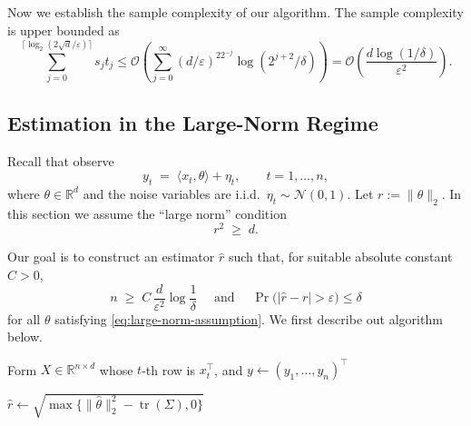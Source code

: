 Now we establish the sample complexity of our algorithm. The sample complexity is upper bounded as
\[
\sum_{j=0}^{\lceil\log_2(2\sqrt{d}/\varepsilon)\rceil}s_jt_j\leq\mathcal{O}\left(\sum_{j=0}^\infty(d/\varepsilon)^22^{-j}\log(2^{j+2}/\delta)\right)=\mathcal{O}\left(\frac{d\log(1/\delta)}{\varepsilon^2}\right).
\]




\subsection{Estimation in the Large-Norm Regime}\label{sec:ball-large-regime}
Recall that observe
\[
y_t \;=\; \langle x_t,\theta\rangle + \eta_t, \qquad t = 1,\dots,n,
\]
where $\theta \in \mathbb{R}^d$ and the noise variables are i.i.d.\ $\eta_t \sim \mathcal{N}(0,1)$. Let $r := \|\theta\|_2$. In this section we assume the ``large norm'' condition
\begin{equation}
r^2 \;\ge\; d.
\label{eq:large-norm-assumption}
\end{equation}

Our goal is to construct an estimator $\hat r$ such that, for suitable absolute
constant $C > 0$,
\[
n \;\ge\; C\,\frac{d}{\varepsilon^2}\log\frac{1}{\delta}
\quad\text{ and }\quad
\Pr\big(|\hat r - r| > \varepsilon\big) \le \delta
\]
for all $\theta$ satisfying \eqref{eq:large-norm-assumption}. We first describe out algorithm below.


\begin{algorithm2e}[H]
\caption{Algorithm for Large-Norm Regime}
\label{alg:large-regime}
\DontPrintSemicolon
{}
\LinesNumbered
{}
\BlankLine
{}
Form $X \in \mathbb{R}^{n\times d}$ whose $t$-th row is $x_t^\top$, and $y \leftarrow (y_1,\dots,y_n)^\top$\;


$\hat r \leftarrow \sqrt{\max\{\|\hat\theta\|_2^2 - \operatorname{tr}(\Sigma),0\}}$\;

\;
\end{algorithm2e}


